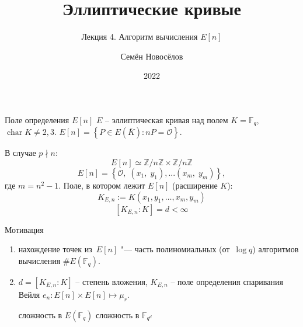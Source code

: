 \documentclass{beamer}
\title{Эллиптические кривые}
\subtitle{Лекция 4. Алгоритм вычисления $E[n]$}
\author{Семён Новосёлов}
\institute{БФУ им. И. Канта}
\date{2022}
\begin{document}
\frame{\titlepage}

\begin{frame}{Поле определения $E[n]$}
$E$ -- эллиптическая кривая над полем $K = \mathbb{F}_q$, $\operatorname{char}{K} \ne 2,3$.
     $E[n] = \left\{ {P \in E\left( \bar{K} \right) : nP = \mathcal{O}} \right\}$.

    В случае $p \nmid n$:
    \[
    E\left[ n \right] \simeq \mathbb{Z}/n\mathbb{Z} \times \mathbb{Z}/n\mathbb{Z}
    \]
    \structure{
    \[\Downarrow\]
	}
    \[
    E\left[n\right] = \left\{ {\mathcal{O},\;\left( {{x_1},\;{y_1}} \right), ... \left( {{x_m},\;{y_m}} \right)} \right\},
    \]
    где $m=n^2-1$.
    \structure{
    \[\Downarrow\]
	}
    Поле, в котором лежит $E\left[ n \right]$ (расширение
    $K$):
    \[
    K_{E,n} := K\left( {{x_1}, {y_1}, \ldots, x_m, y_m} \right)
    \]
    \[
    \left[ K_{E,n} : K \right] = d < \infty 
    \]
\end{frame}

\begin{frame}{Мотивация}
    \begin{enumerate}
        \item нахождение точек из~$E[n]$ "--- часть полиномиальных (от~$\log{q}$) алгоритмов вычисления $\#E(\mathbb{F}_q)$.
        \item $d = [K_{E,n} : K]$ -- степень вложения, $K_{E,n}$ -- поле определения спаривания Вейля $e_n: E[n] \times E[n] \mapsto \mu_r$.
        \begin{center}
            \structure{$\Downarrow$}
        \end{center}
            сложность  в $E(\mathbb{F}_q)$ \structure{$\rightleftarrows$} сложность  в $\mathbb{F}_{q^{d}}$
    \end{enumerate}
\end{frame}
\end{document}
